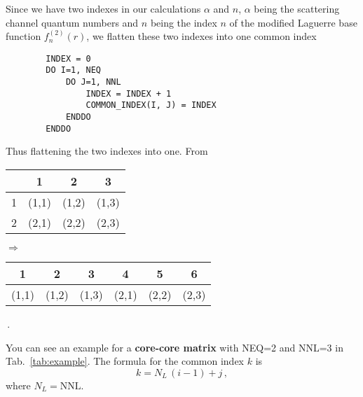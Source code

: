 \documentclass[10pt,a4paper]{article}
\newcommand{\mtm}[1]{\mathrm{#1}}
\begin{document}
	Since we have two indexes in our calculations $\alpha$ and $n$, $\alpha$ being the scattering channel quantum numbers and $n$ being the index $n$ of the modified Laguerre base function $f_n^{(2)}(r)$, we flatten these two indexes into one common index
	\begin{verbatim}
		INDEX = 0
		DO I=1, NEQ
			DO J=1, NNL
				INDEX = INDEX + 1
				COMMON_INDEX(I, J) = INDEX
			ENDDO
		ENDDO
	\end{verbatim}
	Thus flattening the two indexes into one.
	From
	\begin{center}
		\begin{tabular}{c|ccc}	
			 & 1 & 2 & 3 \\\hline
			 1 & (1,1) & (1,2) & (1,3) \\
			 2 & (2,1) & (2,2) & (2,3) \\
			 \hline			 
		\end{tabular}
		\qquad
		$\Rightarrow$
		\qquad
		\begin{tabular}{ccc|ccc}
			1 & 2 & 3 & 4 & 5 & 6\\
			\hline
			(1,1) & (1,2) & (1,3) & (2,1) & (2,2) & (2,3)
		\end{tabular}\,.
	\end{center}
	You can see an example for a \textbf{core-core matrix} with NEQ=2 and NNL=3 in Tab.~\ref{tab:example}.
	The formula for the common index $k$ is
	\begin{equation}
		k = N_L \,(i-1) + j\,,
		\label{fromNNLNCHtoINDEX}
	\end{equation}
	where $N_L=\mtm{NNL}$.
	
\end{document}
